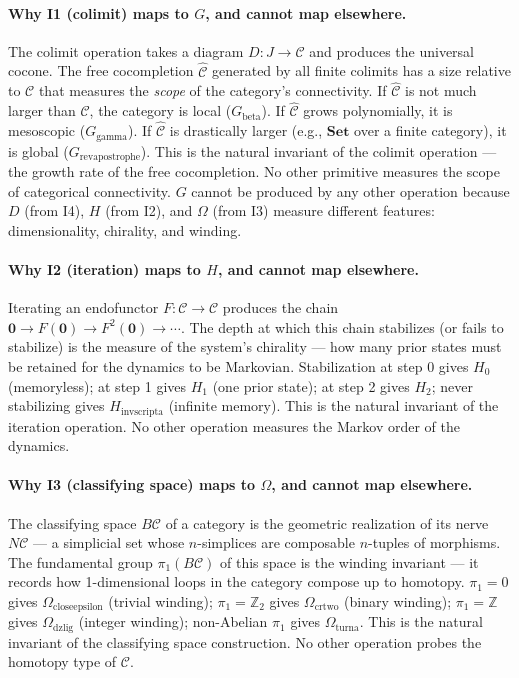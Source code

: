 \documentclass[12pt,a4paper]{article}
\begin{document}
\paragraph{Why I1 (colimit) maps to $G$, and cannot map elsewhere.}
The colimit operation takes a diagram $D: J \to \mathcal{C}$ and produces the universal cocone. The free cocompletion $\hat{\mathcal{C}}$ generated by all finite colimits has a size relative to $\mathcal{C}$ that measures the \emph{scope} of the category's connectivity. If $\hat{\mathcal{C}}$ is not much larger than $\mathcal{C}$, the category is local ($G_{\text{beta}}$). If $\hat{\mathcal{C}}$ grows polynomially, it is mesoscopic ($G_{\text{gamma}}$). If $\hat{\mathcal{C}}$ is drastically larger (e.g., $\mathbf{Set}$ over a finite category), it is global ($G_{\text{revapostrophe}}$). This is the natural invariant of the colimit operation --- the growth rate of the free cocompletion. No other primitive measures the scope of categorical connectivity. $G$ cannot be produced by any other operation because $D$ (from I4), $H$ (from I2), and $\Omega$ (from I3) measure different features: dimensionality, chirality, and winding.

\paragraph{Why I2 (iteration) maps to $H$, and cannot map elsewhere.}
Iterating an endofunctor $F: \mathcal{C} \to \mathcal{C}$ produces the chain $\mathbf{0} \to F(\mathbf{0}) \to F^2(\mathbf{0}) \to \cdots$. The depth at which this chain stabilizes (or fails to stabilize) is the measure of the system's chirality --- how many prior states must be retained for the dynamics to be Markovian. Stabilization at step 0 gives $H_0$ (memoryless); at step 1 gives $H_1$ (one prior state); at step 2 gives $H_2$; never stabilizing gives $H_{\text{invscripta}}$ (infinite memory). This is the natural invariant of the iteration operation. No other operation measures the Markov order of the dynamics.

\paragraph{Why I3 (classifying space) maps to $\Omega$, and cannot map elsewhere.}
The classifying space $B\mathcal{C}$ of a category is the geometric realization of its nerve $N\mathcal{C}$ --- a simplicial set whose $n$-simplices are composable $n$-tuples of morphisms. The fundamental group $\pi_1(B\mathcal{C})$ of this space is the winding invariant --- it records how 1-dimensional loops in the category compose up to homotopy. $\pi_1 = 0$ gives $\Omega_{\text{closeepsilon}}$ (trivial winding); $\pi_1 = \mathbb{Z}_2$ gives $\Omega_{\text{crtwo}}$ (binary winding); $\pi_1 = \mathbb{Z}$ gives $\Omega_{\text{dzlig}}$ (integer winding); non-Abelian $\pi_1$ gives $\Omega_{\text{turna}}$. This is the natural invariant of the classifying space construction. No other operation probes the homotopy type of $\mathcal{C}$.
\end{document}
